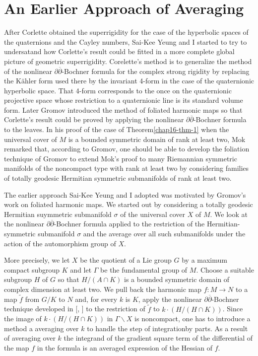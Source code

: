 \section*{An Earlier Approach of Averaging}
After Corlette \cite{chap16-keyCo} obtained the superrigidity for the case of the hyperbolic spaces of the quaternions and the Cayley numbers, Sai-Kee Yeung and I started to try to undersatand how Corlette's result could be fitted in a more complete global picture of geometric superrigidity. Corelette's method is to generalize the method of the nonlinear $\partial\overline{\partial}$-Bochner formula for the complex strong rigidity by replacing the K\"ahler form used there by the invariant 4-form in the case of the quaternionic hyperbolic space. That 4-form corresponds to the once on the quaternionic projective space whose restriction to a quaternionic line is its standard volume form. Later Gromov \cite{chap16-keyG} introduced the method of foliated harmonic maps so that Corlette's result could be proved by applying the nonlinear $\partial\overline{\partial}$-Bochner formula to the leaves. In his proof of the case of Theorem\ref{chap16-thm-1} when the universal cover of $M$ is a bounded symmetric domain of rank at least two, Mok \cite{chap16-keyMo} remarked that, according to Gromov, one should be able to develop the foliation technique of Gromov \cite{chap16-keyG} to extend Mok's proof to many Riemannian symmetric manifolds of the noncompact type with rank at least two by considering families of totally geodesic Hermitian symmetric submanifolds of rank at least two.

The earlier approach Sai-Kee Yeung and I adopted was motivated by Gromov's work on foliated harmonic maps. We started out by considering a totally geodesic Hermitian suymmetric submanifold $\sigma$ of the universal cover $X$ of $M$. We look at the nonlinear $\partial\overline{\partial}$-Bochner formula applied to the restriction of the Hermitian-symmetric submanifold $\sigma$ and the average over all such submanifolds under the action of the automorphism group of $X$.

More precisely, we let $X$ be the quotient of a Lie group $G$ by a maximum compact subgroup $K$ and let $\Gamma$ be the fundamental group of $M$. Choose a suitable subgroup $H$ of $G$ so that $H/(A\cap K)$ is a bounded symmetric domain of complex dimension at least two. We pull back the harmonic map $f: M \rightarrow N$ to a map $\tilde{f}$ from $G/K$ to $N$ and, for every $k$ is $K$, apply the nonlinear $\partial\overline{\partial}$-Bochner technique developed in [\cite{chap16-keySi}, \cite{chap16-keySa}] to the restriction of $\tilde{f}$ to $k \cdot(H/(H \cap K))$. Since the image of $k\cdot (H /(H \cap K))$ in $\Gamma\backslash X$ is noncompact, one has to introduce a method a averaging over $k$ to handle the step of integration\pageoriginale by parts. As a result of averaging over $k$ the integrand of the gradient square term of the differential of the map $f$ in the formula is an averaged expression of the Hessian of $f$.

